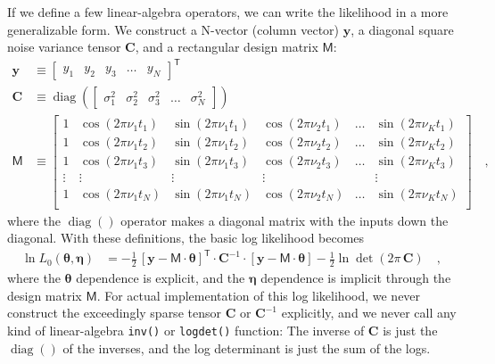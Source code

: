 \documentclass[modern]{aastex63}
\newcommand{\code}[1]{\texttt{#1}}
\newcommand{\T}{^{\!\mathsf{T}\!}}
\newcommand{\inv}{^{-1}}
\renewcommand{\vector}[1]{\boldsymbol{#1}}
\newcommand{\vy}{\vector{y}}
\newcommand{\veta}{\vector{\eta}}
\newcommand{\vtheta}{\vector{\theta}}
\renewcommand{\tensor}[1]{\mathbf{#1}}
\newcommand{\tC}{\tensor{C}}
\DeclareMathOperator{\diag}{diag}
\newcommand{\mat}[1]{\mathsf{#1}}
\newcommand{\mM}{\mat{M}}
\begin{document}
If we define a few linear-algebra operators, we can write the likelihood in a more
generalizable form.
We construct a N-vector (column vector) $\vy$, a diagonal square noise
variance tensor $\tC$, and a rectangular design matrix $\mM$:
\begin{align}
  \vy &\equiv \begin{bmatrix} y_1 & y_2 & y_3 & \hdots & y_N \end{bmatrix}\T
  \\
  \tC &\equiv \diag(\begin{bmatrix} \sigma_1^2 & \sigma_2^2 & \sigma_3^2 & \hdots & \sigma_N^2 \end{bmatrix})
  \\
  \mM &\equiv \begin{bmatrix}
    1 & \cos(2\pi\nu_1 t_1) & \sin(2\pi\nu_1 t_1) & \cos(2\pi\nu_2 t_1) & \hdots & \sin(2\pi\nu_K t_1) \\
    1 & \cos(2\pi\nu_1 t_2) & \sin(2\pi\nu_1 t_2) & \cos(2\pi\nu_2 t_2) & \hdots & \sin(2\pi\nu_K t_2) \\
    1 & \cos(2\pi\nu_1 t_3) & \sin(2\pi\nu_1 t_3) & \cos(2\pi\nu_2 t_3) & \hdots & \sin(2\pi\nu_K t_3) \\
    \vdots & \vdots         & \vdots              & \vdots              &        & \vdots \\
    1 & \cos(2\pi\nu_1 t_N) & \sin(2\pi\nu_1 t_N) & \cos(2\pi\nu_2 t_N) & \hdots & \sin(2\pi\nu_K t_N) \\
  \end{bmatrix}
  \quad ,
\end{align}
where the $\diag()$ operator makes a diagonal matrix with the inputs down
the diagonal.
With these definitions, the basic log likelihood becomes
\begin{align}
  \ln L_0(\vtheta,\veta) &= -\frac{1}{2}\,[\vy - \mM\cdot\vtheta]\T\cdot\tC\inv\cdot[\vy - \mM\cdot\vtheta] - \frac{1}{2}\ln\det(2\pi\,\tC)
  \quad ,
\end{align}
where the $\vtheta$ dependence is explicit, and the $\veta$ dependence
is implicit through the design matrix $\mM$.
For actual implementation of this log likelihood, we never construct
the exceedingly sparse tensor $\tC$ or $\tC\inv$ explicitly, and we
never call any kind of linear-algebra \code{inv()} or \code{logdet()} function:
The inverse of $\tC$ is just the $\diag()$ of the inverses, and the
log determinant is just the sum of the logs.
\end{document}
